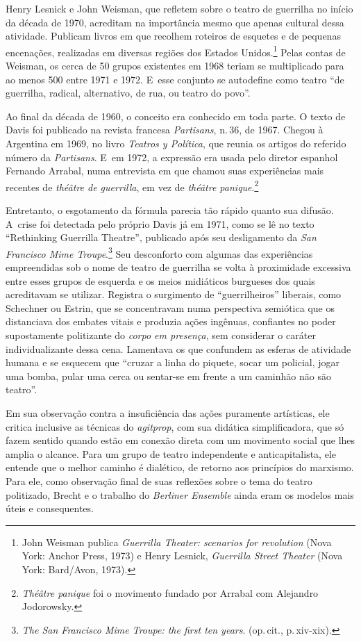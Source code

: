 {Henry Lesnick e John Weisman, que refletem sobre o teatro de guerrilha
no início da década de 1970, acreditam na importância mesmo que
apenas cultural dessa atividade. Publicam livros em que recolhem
roteiros de esquetes e de pequenas encenações, realizadas em diversas
regiões dos Estados Unidos.\footnote{John Weisman publica {\it Guerrilla
  Theater: scenarios for revolution} (Nova York: Anchor Press, 1973) e
  Henry Lesnick, {\it Guerrilla Street Theater} (Nova York: Bard/Avon,
  1973).} Pelas contas de Weisman, os cerca de 50 grupos existentes em
1968 teriam se multiplicado para ao menos 500 entre 1971 e 1972. E~esse
conjunto se autodefine como teatro “de guerrilha, radical, alternativo,
de rua, ou teatro do povo”.

Ao final da década de 1960, o conceito era conhecido em toda parte. O
texto de Davis foi publicado na revista francesa {\it Partisans}, n.\,36,
de 1967. Chegou à Argentina em 1969, no livro {\it Teatros y Política},
que reunia os artigos do referido número da {\it Partisans}. E~em 1972,
a expressão era usada pelo diretor espanhol Fernando Arrabal, numa
entrevista em que chamou suas experiências mais recentes de {\it théâtre
de guerrilla}, em vez de {\it théâtre panique}.\footnote{{\it Théâtre
  panique} foi o movimento fundado por Arrabal com Alejandro Jodorowsky.}

Entretanto, o esgotamento da fórmula parecia tão rápido quanto sua
difusão. A~crise foi detectada pelo próprio Davis já em 1971, como se lê
no texto “Rethinking Guerrilla Theatre”, publicado após seu
desligamento da {\it San Francisco Mime Troupe}.\footnote{{\it The San Francisco Mime Troupe: the first ten years}.
  (op.\,cit., p.\,xiv-xix).} Seu desconforto com algumas das experiências
empreendidas sob o nome de teatro de guerrilha se volta à
proximidade excessiva entre esses grupos de esquerda e os meios
midiáticos burgueses dos quais acreditavam se utilizar. Registra o
surgimento de “guerrilheiros” liberais, como Schechner ou Estrin, que se
concentravam numa perspectiva semiótica que os distanciava dos embates
vitais e produzia ações ingênuas, confiantes no poder supostamente
politizante do {\it corpo em presença}, sem considerar o caráter
individualizante dessa cena. Lamentava os que confundem as esferas de
atividade humana e se esquecem que “cruzar a linha do piquete, socar um
policial, jogar uma bomba, pular uma cerca ou sentar-se em frente a um
caminhão não são teatro”.

Em sua observação contra a insuficiência das ações puramente artísticas,
ele critica inclusive as técnicas do {\it agitprop}, com sua didática
simplificadora, que só fazem sentido quando estão em conexão direta com
um movimento social que lhes amplia o alcance. Para um grupo de teatro
independente e anticapitalista, ele entende que o melhor caminho é
dialético, de retorno aos princípios do marxismo. Para ele, como
observação final de suas reflexões sobre o tema do teatro politizado,
Brecht e o trabalho do {\it Berliner Ensemble} ainda eram os modelos mais
úteis e consequentes.

}
